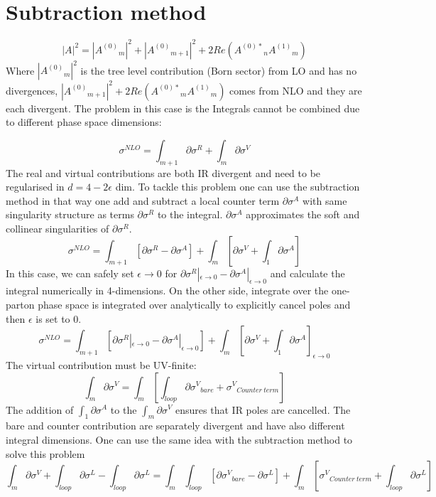 \section{Subtraction method}
\begin{equation}
|A|^2 = |{A^{(0)}}_m|^2 +  |{A^{(0)}}_{m+1}|^2+ 2Re({A^{(0)*}}_{n}{A^{(1)}}_{m})
\end{equation}
Where $ |{A^{(0)}}_m|^2 $ is the tree level contribution (Born sector) from LO and has no divergences, $ |{A^{(0)}}_{m+1}|^2+ 2Re({A^{(0)*}}_{m}{A^{(1)}}_{m}) $ comes from NLO and they are each divergent. The problem in this case is the Integrals cannot be combined due to different phase space dimensions:

\begin{equation}
\sigma^{NLO} = \int_{m+1} \partial \sigma^R +\int_{m} \partial \sigma^V
\end{equation}
The real and virtual contributions are both IR divergent and need to be regularised in $ d = 4-2\epsilon $ dim.
To tackle this problem one can use the subtraction method in that way one add and subtract a local counter term $ \partial \sigma^A $ with same singularity structure as terms $ \partial \sigma^R $ to the integral. $ \partial \sigma^A $ approximates the soft and collinear singularities of $ \partial \sigma^R  $.
\begin{equation}
\sigma^{NLO} = \int_{m+1} [\partial \sigma^R -\partial \sigma^A]+\int_{m} [\partial \sigma^V+\int_1 \partial \sigma^A]
\end{equation}
In this case, we can safely set $ \epsilon \rightarrow 0 $ for $ \partial \sigma^R |_{\epsilon \rightarrow 0}  -\partial \sigma^A |_{\epsilon \rightarrow 0} $ and calculate the integral numerically in 4-dimensions. On the other side, integrate over the one-parton phase space is integrated over analytically to explicitly cancel poles and then $ \epsilon $ is set to $ 0 $.
\begin{equation}
\sigma^{NLO} = \int_{m+1} [\partial \sigma^R |_{\epsilon \rightarrow 0}  -\partial \sigma^A |_{\epsilon \rightarrow 0}]+\int_{m} [\partial \sigma^V+\int_1 \partial \sigma^A]_{\epsilon \rightarrow 0}
\end{equation}
The virtual contribution must be UV-finite:
\begin{equation}
\int_{m} \partial \sigma^V= \int_m [\int_{loop} \partial {\sigma^V}_{bare} + {\sigma^V}_{Counter\:term}]
\end{equation}
The addition of $\int_1 \partial \sigma^A$ to the $ \int_{m} \partial \sigma^V $ ensures that IR poles are cancelled.
The bare and counter contribution are separately divergent and have also different integral dimensions. One can use the same idea with the subtraction method to solve this problem~\cite{Catani:2002hc, Catani:1996vz}
\begin{equation}
\int_{m} \partial \sigma^V +\int_{loop} \partial {\sigma^L}-\int_{loop} \partial {\sigma^L}= \int_m \int_{loop}[ \partial {\sigma^V}_{bare}- \partial {\sigma^L}] + \int_m[{\sigma^V}_{Counter\:term}+ \int_{loop} \partial {\sigma^L}]
\end{equation}


